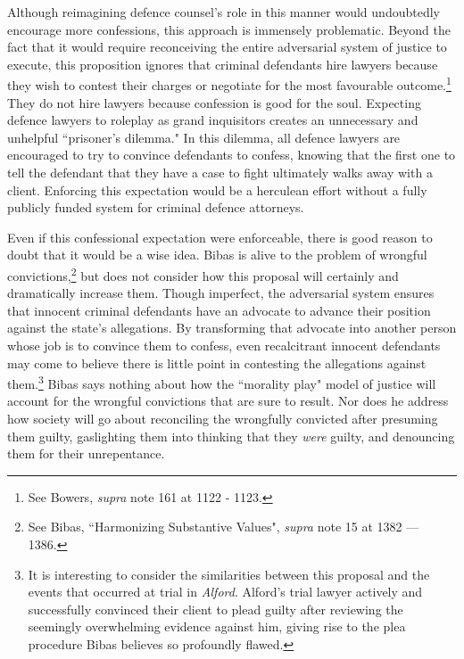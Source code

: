 Although reimagining defence counsel's role in this manner would undoubtedly encourage more confessions, this approach is immensely problematic. Beyond the fact that it would require reconceiving the entire adversarial system of justice to execute, this proposition ignores that criminal defendants hire lawyers because they wish to contest their charges or negotiate for the most favourable outcome.\footnote{See Bowers, \textit{supra} note 161 at 1122 - 1123.} They do not hire lawyers because confession is good for the soul. Expecting defence lawyers to roleplay as grand inquisitors creates an unnecessary and unhelpful ``prisoner's dilemma." In this dilemma, all defence lawyers are encouraged to try to convince defendants to confess, knowing that the first one to tell the defendant that they have a case to fight ultimately walks away with a client. Enforcing this expectation would be a herculean effort without a fully publicly funded system for criminal defence attorneys.

Even if this confessional expectation were enforceable, there is good reason to doubt that it would be a wise idea. Bibas is alive to the problem of wrongful convictions,\footnote{See Bibas, ``Harmonizing Substantive Values", \textit{supra} note 15 at 1382 — 1386.} but does not consider how this proposal will certainly and dramatically increase them. Though imperfect, the adversarial system ensures that innocent criminal defendants have an advocate to advance their position against the state's allegations. By transforming that advocate into another person whose job is to convince them to confess, even recalcitrant innocent defendants may come to believe there is little point in contesting the allegations against them.\footnote{It is interesting to consider the similarities between this proposal and the events that occurred at trial in \textit{Alford}. Alford's trial lawyer actively and successfully convinced their client to plead guilty after reviewing the seemingly overwhelming evidence against him, giving rise to the plea procedure Bibas believes so profoundly flawed.} Bibas says nothing about how the ``morality play" model of justice will account for the wrongful convictions that are sure to result. Nor does he address how society will go about reconciling the wrongfully convicted after presuming them guilty, gaslighting them into thinking that they \textit{were} guilty, and denouncing them for their unrepentance. 

